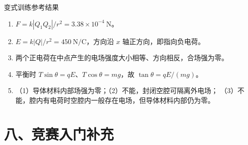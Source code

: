 \begin{learningbox}{变式训练参考结果}
\begin{enumerate}[itemsep=0.45em,topsep=0.3em,parsep=0pt]
  \item $F=k|Q_1Q_2|/r^2=3.38\times10^{-4}\ \mathrm N$。
  \item $E=k|Q|/r^2=450\ \mathrm{N/C}$，方向沿 $x$ 轴正方向，即指向负电荷。
  \item 两个正电荷在中点产生的电场强度大小相等、方向相反，合场强为零。
  \item 平衡时 $T\sin\theta=qE$、$T\cos\theta=mg$，故
  $\tan\theta=qE/(mg)$。
  \item （1）导体材料内部场强为零；（2）不能，封闭空腔可隔离外电场；
  （3）不能，腔内有电荷时空腔内一般存在电场，但导体材料内部仍为零。
\end{enumerate}
\end{learningbox}

\section*{八、竞赛入门补充}

